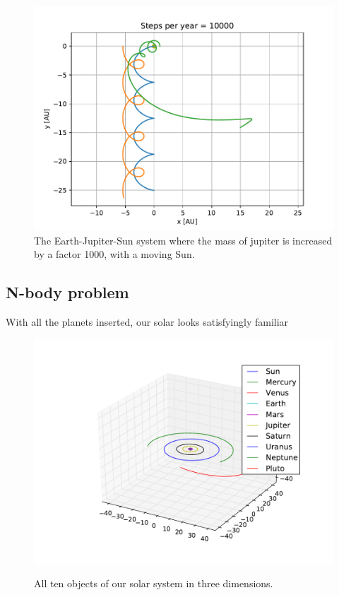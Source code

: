 \documentclass[10pt]{article}
\begin{document}
\begin{multicols}{2}
\begin{figure}[H]
    \centering
    \includegraphics[width=1.0\linewidth]{../results/EJSx1000_moving.pdf}
    \caption{The Earth-Jupiter-Sun system where the mass of jupiter is
    increased by a factor 1000, with a moving Sun.}
    \label{fig:jupiter1000x2}
\end{figure}

\subsection{N-body problem}
With all the planets inserted, our solar looks satisfyingly familiar

\begin{figure}[H]
    \centering
    \includegraphics[width=1.0\linewidth]{../results/full_system.pdf}
    \label{fig:name}
    \caption{All ten objects of our solar system in three dimensions.}
\end{figure}


\end{multicols}
\end{document}
